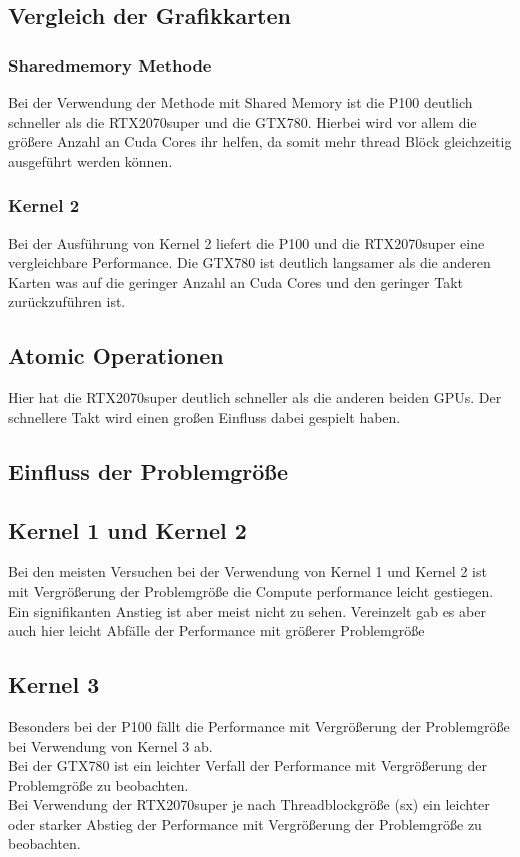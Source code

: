 \documentclass[10pt,a4paper]{article}
\begin{document}
	 \subsection*{Vergleich der Grafikkarten}
	  \subsubsection{Sharedmemory Methode}
	  Bei der Verwendung der Methode mit Shared Memory ist die P100 deutlich schneller als die RTX2070super und die GTX780. Hierbei wird vor allem die größere Anzahl an Cuda Cores ihr helfen, da somit mehr thread Blöck gleichzeitig ausgeführt werden können.
	  \subsubsection{Kernel 2}
	  Bei der Ausführung von Kernel 2 liefert die P100 und die RTX2070super eine vergleichbare Performance. 
	  Die GTX780 ist deutlich langsamer als die anderen Karten was auf die geringer Anzahl an Cuda Cores und den geringer Takt zurückzuführen ist.
	  \subsection{Atomic Operationen}
	  Hier hat die RTX2070super deutlich schneller als die anderen beiden GPUs. Der schnellere Takt wird einen großen Einfluss dabei gespielt haben.
	  \subsection{Einfluss der Problemgröße}
	  \subsection{Kernel 1 und Kernel 2}
	  Bei den meisten Versuchen bei der Verwendung von Kernel 1 und Kernel 2 ist mit Vergrößerung der Problemgröße die Compute performance leicht gestiegen. Ein signifikanten Anstieg ist aber meist nicht zu sehen. Vereinzelt gab es aber auch hier leicht Abfälle der Performance mit größerer Problemgröße
	  \subsection{Kernel 3}
	  Besonders bei der P100 fällt die Performance mit Vergrößerung der Problemgröße bei Verwendung von Kernel 3 ab.\\ Bei der GTX780 ist ein leichter Verfall der Performance mit Vergrößerung der Problemgröße zu beobachten.\\
	  Bei Verwendung der RTX2070super je nach Threadblockgröße (sx) ein leichter oder starker Abstieg der Performance mit Vergrößerung der Problemgröße zu beobachten.
\end{document}
